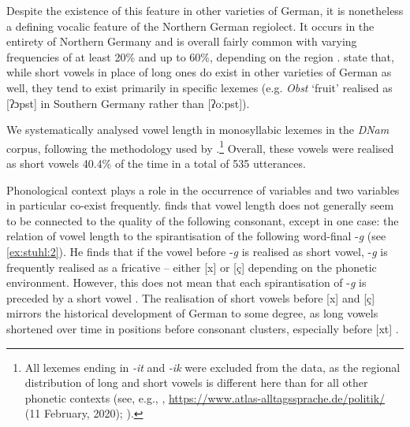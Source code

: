 \documentclass[output=paper]{langsci/langscibook}
\begin{document}
Despite the existence of this feature in other varieties of German, it is nonetheless a defining vocalic feature of the Northern German regiolect. It occurs in the entirety of Northern Germany and is overall fairly common with varying frequencies of at least 20\% and up to 60\%, depending on the region \citep[144]{elmentaler_norddeutscher_2015}. \citet[142]{elmentaler_norddeutscher_2015} state that, while short vowels in place of long ones do exist in other varieties of German as well, they tend to exist primarily in specific lexemes (e.g. \textit{Obst} ‘fruit’ realised as [ʔɔpst] in Southern Germany rather than [ʔoːpst]). 

\begin{sloppypar}
We systematically analysed vowel length in monosyllabic lexemes in the \textit{DNam} corpus, following the methodology used by \citet[144]{elmentaler_norddeutscher_2015}.\footnote{All lexemes ending in \textit{-it} and \textit{-ik} were excluded from the data, as the regional distribution of long and short vowels is different here than for all other phonetic contexts (see, e.g., \citealt{elspas_atlas_2003}, \url{https://www.atlas-alltagssprache.de/politik/} (11 February, 2020); \citealt[151--152]{elmentaler_norddeutscher_2015}).} Overall, these vowels were realised as short vowels 40.4\% of the time in a total of 535 utterances.
\end{sloppypar}

Phonological context plays a role in the occurrence of variables and two variables in particular co-exist frequently. \citet[77]{elmentaler_varietatendynamik_2008} finds that vowel length does not generally seem to be connected to the quality of the following consonant, except in one case: the relation of vowel length to the spirantisation of the following word-final -\textit{g} (see \ref{ex:stuhl:2}). He finds that if the vowel before -\textit{g} is realised as short vowel, -\textit{g} is frequently realised as a fricative – either [x] or [ç] depending on the phonetic environment. However, this does not mean that each spirantisation of -\textit{g} is preceded by a short vowel \citep[77]{elmentaler_varietatendynamik_2008}. The realisation of short vowels before [x] and [ç] mirrors the historical development of German to some degree, as long vowels shortened over time in positions before consonant clusters, especially before [xt] \citep[152]{szulc_historische_1987}.\largerpage
\end{document}
